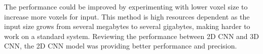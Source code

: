 The performance could be improved by experimenting with lower voxel size to increase more voxels for input. 
This method is high resources dependent as the input size grows from several megabytes to several gigabytes, making harder to work on a standard system.
Reviewing the performance between 2D CNN and 3D CNN, the 2D CNN model was providing better performance and precision.
